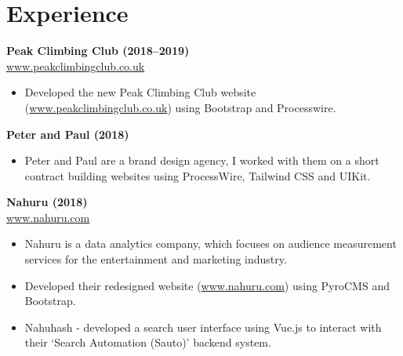 \documentclass[11pt,a4paper,sans]{moderncv}
\begin{document}
\section{Experience}

\begin{small}
\textbf{Peak Climbing Club (2018--2019)}\\
\href{http://www.peakclimbingclub.co.uk}{www.peakclimbingclub.co.uk}
\begin{itemize}%
\item Developed the new Peak Climbing Club website (\href{http://www.peakclimbingclub.co.uk}{www.peakclimbingclub.co.uk}) using Bootstrap and Processwire. 
\end{itemize}
\textbf{Peter and Paul (2018)}
\begin{itemize}
\item Peter and Paul are a brand design agency, I worked with them on a short contract building websites using ProcessWire, Tailwind CSS and UIKit.
\end{itemize}

\textbf{Nahuru (2018)}\\
\href{http://www.nahuru.com}{www.nahuru.com}
\begin{itemize}%
\item Nahuru is a data analytics company, which focuses on audience measurement services for the entertainment and marketing industry.
\item Developed their redesigned website (\href{http://www.nahuru.com}{www.nahuru.com}) using PyroCMS and Bootstrap.
\item Nahuhash - developed a search user interface using Vue.js to interact with their `Search Automation (Sauto)' backend system. \\
\end{itemize}

\end{small}
\end{document}

